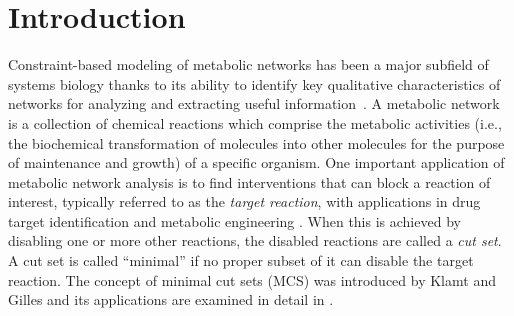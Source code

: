 \documentclass{bioinfo}
\theoremstyle{plain}
\theoremstyle{definition}
\begin{document}
\maketitle

\section{Introduction}
Constraint-based modeling of metabolic networks has been a major subfield of systems biology thanks to its ability to identify key qualitative characteristics of networks for analyzing and extracting useful information~\cite{Price, cbm1, cbm2}. %
A metabolic network is a collection of chemical reactions which comprise the  metabolic activities (i.e., the biochemical transformation of molecules into other molecules for the purpose of maintenance and growth) of a specific organism. One important application of metabolic network analysis is to find interventions that can block a reaction of interest, typically referred to as the \textit{target reaction}, with applications in drug target identification \cite{DrugTarget,ecloi_bio, growth, pathway, engineering} and metabolic engineering \cite{MetabEng}. When this is achieved by disabling one or more other reactions, the disabled reactions are called a \emph{cut set}. A cut set is called ``minimal'' if no proper subset of it can disable the target reaction. The concept of minimal cut sets (MCS) was introduced by Klamt and Gilles \cite{MCS} and its applications are examined in detail in \cite{MCS2}. %
\end{document}
